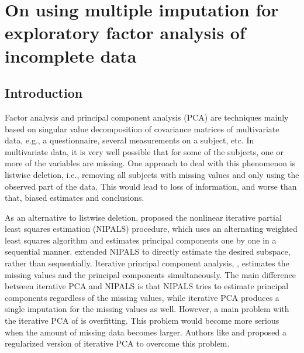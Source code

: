 \documentclass[11pt,a5paper,twoside]{book}
\begin{document}
\newpage



\section[Multiple imputation for EFA]{On using multiple imputation for exploratory factor analysis of incomplete data}
\label{secc_mifa}
\subsection{Introduction}
Factor analysis and principal component analysis (PCA) are techniques mainly based on singular value decomposition of covariance matrices of multivariate data, e.g., a questionnaire, several measurements on a subject, etc. In multivariate data, it is very well possible that for some of the subjects, one or more of the variables are missing. One approach to deal with this phenomenon is listwise deletion, i.e., removing all subjects with missing values and only using the observed part of the data. This would lead to loss of information, and worse than that, biased estimates and conclusions.

As an alternative to listwise deletion, \cite{wold1969} proposed the nonlinear iterative partial least squares estimation (NIPALS) procedure, which uses an alternating weighted least squares algorithm and estimates principal components one by one in a sequential manner. \cite{gabriel1979} extended NIPALS to directly estimate the desired subspace, rather than sequentially. Iterative principal component analysis, \cite{kiers1997}, estimates the missing values and the principal components simultaneously. The main difference between iterative PCA and NIPALS is that NIPALS tries to estimate principal components regardless of the missing values, while iterative PCA produces a single imputation for the missing values as well. However, a main problem with the iterative PCA of \cite{kiers1997} is overfitting. This problem would become more serious when the amount of missing data becomes larger. Authors like \citet*{josse2009} and \cite{ilin2010} proposed a regularized version of iterative PCA to overcome this problem. 
\end{document}
